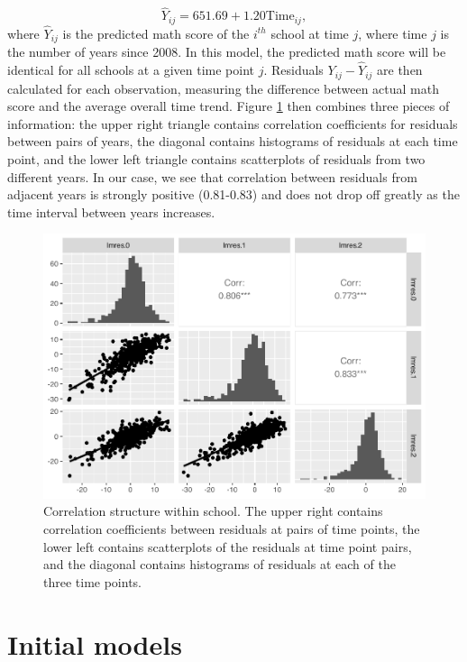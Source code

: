 \documentclass[
]{krantz}
\begin{document}
\begin{equation*}
\hat{Y}_{ij}=651.69+1.20\textrm{Time}_{ij},
\end{equation*}
where \(\hat{Y}_{ij}\) is the predicted math score of the \(i^{th}\) school at time \(j\), where time \(j\) is the number of years since 2008. In this model, the predicted math score will be identical for all schools at a given time point \(j\). Residuals \(Y_{ij}-\hat{Y}_{ij}\) are then calculated for each observation, measuring the difference between actual math score and the average overall time trend. Figure \ref{fig:lon-cor1} then combines three pieces of information: the upper right triangle contains correlation coefficients for residuals between pairs of years, the diagonal contains histograms of residuals at each time point, and the lower left triangle contains scatterplots of residuals from two different years. In our case, we see that correlation between residuals from adjacent years is strongly positive (0.81-0.83) and does not drop off greatly as the time interval between years increases.

\begin{figure}

{\centering \includegraphics[width=0.6\linewidth]{bookdown-BeyondMLR_files/figure-latex/lon-cor1-1} 

}

\caption{Correlation structure within school.  The upper right contains correlation coefficients between residuals at pairs of time points, the lower left contains scatterplots of the residuals at time point pairs, and the diagonal contains histograms of residuals at each of the three time points.}\label{fig:lon-cor1}
\end{figure}

\hypertarget{lineartwostageerror}{%
\section{Initial models}\label{lineartwostageerror}}
\end{document}
